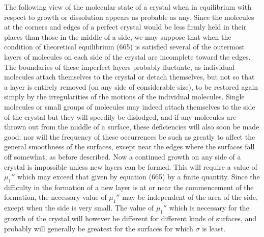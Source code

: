 \documentclass[12pt]{article}
\begin{document}
{The following view of the molecular state of a crystal when in equilibrium with respect to growth or dissolution appears as probable as any. Since the molecules at the corners and edges of a perfect crystal would be less firmly held in their places than those in the middle of a side, we may suppose that when the condition of theoretical equilibrium (665) is satisfied several of the outermost layers of molecules on each side of the crystal are incomplete toward the edges. The boundaries of these imperfect layers probably fluctuate, as individual molecules attach themselves to the crystal or detach themselves, but not so that a layer is entirely removed (on any side of considerable size), to be restored again simply by the irregularities of the motions of the individual molecules.  Single molecules or small groups of molecules may indeed attach themselves to the side of the crystal but they will speedily be dislodged, and if any molecules are thrown out from the middle of a surface, these deficiencies will also soon be made good; nor will the frequency of these occurrences be such as greatly to affect the general smoothness of the surfaces, except near the edges where the surfaces fall off somewhat, as before described. Now a continued growth on any side of a crystal is impossible unless new layers can be formed. This will require a value of $\mu_1''$ which may exceed that given by equation (665) by a finite quantity. Since the difficulty in the formation of a new layer is at or near the commencement of the formation, the necessary value of $\mu_1''$ may be independent of the area of the side, except when the side is very small. The value of $\mu_1''$ which is necessary for the growth of the crystal will however be different for different kinds of surfaces, and probably will generally be greatest for the surfaces for which $\sigma$ is least.

}
\end{document}
